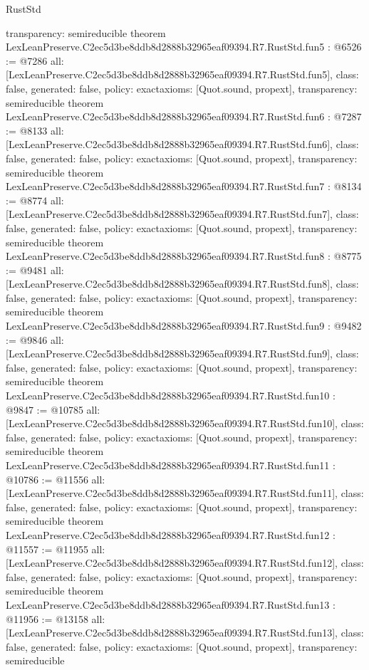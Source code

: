 \begin{lexlean}{RustStd}
\begin{coremodule}
{  transparency: semireducible
}
theorem LexLeanPreserve.C2ec5d3be8ddb8d2888b32965eaf09394.R7.RustStd.fun5 : @6526 := @7286 {
  all: [LexLeanPreserve.C2ec5d3be8ddb8d2888b32965eaf09394.R7.RustStd.fun5],
  class: false,
  generated: false,
  policy: exact{axioms: [Quot.sound, propext]},
  transparency: semireducible
}
theorem LexLeanPreserve.C2ec5d3be8ddb8d2888b32965eaf09394.R7.RustStd.fun6 : @7287 := @8133 {
  all: [LexLeanPreserve.C2ec5d3be8ddb8d2888b32965eaf09394.R7.RustStd.fun6],
  class: false,
  generated: false,
  policy: exact{axioms: [Quot.sound, propext]},
  transparency: semireducible
}
theorem LexLeanPreserve.C2ec5d3be8ddb8d2888b32965eaf09394.R7.RustStd.fun7 : @8134 := @8774 {
  all: [LexLeanPreserve.C2ec5d3be8ddb8d2888b32965eaf09394.R7.RustStd.fun7],
  class: false,
  generated: false,
  policy: exact{axioms: [Quot.sound, propext]},
  transparency: semireducible
}
theorem LexLeanPreserve.C2ec5d3be8ddb8d2888b32965eaf09394.R7.RustStd.fun8 : @8775 := @9481 {
  all: [LexLeanPreserve.C2ec5d3be8ddb8d2888b32965eaf09394.R7.RustStd.fun8],
  class: false,
  generated: false,
  policy: exact{axioms: [Quot.sound, propext]},
  transparency: semireducible
}
theorem LexLeanPreserve.C2ec5d3be8ddb8d2888b32965eaf09394.R7.RustStd.fun9 : @9482 := @9846 {
  all: [LexLeanPreserve.C2ec5d3be8ddb8d2888b32965eaf09394.R7.RustStd.fun9],
  class: false,
  generated: false,
  policy: exact{axioms: [Quot.sound, propext]},
  transparency: semireducible
}
theorem LexLeanPreserve.C2ec5d3be8ddb8d2888b32965eaf09394.R7.RustStd.fun10 : @9847 := @10785 {
  all: [LexLeanPreserve.C2ec5d3be8ddb8d2888b32965eaf09394.R7.RustStd.fun10],
  class: false,
  generated: false,
  policy: exact{axioms: [Quot.sound, propext]},
  transparency: semireducible
}
theorem LexLeanPreserve.C2ec5d3be8ddb8d2888b32965eaf09394.R7.RustStd.fun11 : @10786 := @11556 {
  all: [LexLeanPreserve.C2ec5d3be8ddb8d2888b32965eaf09394.R7.RustStd.fun11],
  class: false,
  generated: false,
  policy: exact{axioms: [Quot.sound, propext]},
  transparency: semireducible
}
theorem LexLeanPreserve.C2ec5d3be8ddb8d2888b32965eaf09394.R7.RustStd.fun12 : @11557 := @11955 {
  all: [LexLeanPreserve.C2ec5d3be8ddb8d2888b32965eaf09394.R7.RustStd.fun12],
  class: false,
  generated: false,
  policy: exact{axioms: [Quot.sound, propext]},
  transparency: semireducible
}
theorem LexLeanPreserve.C2ec5d3be8ddb8d2888b32965eaf09394.R7.RustStd.fun13 : @11956 := @13158 {
  all: [LexLeanPreserve.C2ec5d3be8ddb8d2888b32965eaf09394.R7.RustStd.fun13],
  class: false,
  generated: false,
  policy: exact{axioms: [Quot.sound, propext]},
  transparency: semireducible
}
\end{coremodule}
\end{lexlean}

